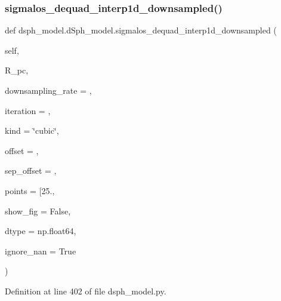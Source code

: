 \subsubsection{\texorpdfstring{sigmalos\+\_\+dequad\+\_\+interp1d\+\_\+downsampled()}{sigmalos\_dequad\_interp1d\_downsampled()}}
{\footnotesize\ttfamily def dsph\+\_\+model.\+d\+Sph\+\_\+model.\+sigmalos\+\_\+dequad\+\_\+interp1d\+\_\+downsampled (\begin{DoxyParamCaption}\item[{}]{self,  }\item[{}]{R\+\_\+pc,  }\item[{}]{downsampling\+\_\+rate = {},  }\item[{}]{iteration = {},  }\item[{}]{kind = {\ttfamily \char`\"{}cubic\char`\"{}},  }\item[{}]{offset = {},  }\item[{}]{sep\+\_\+offset = {},  }\item[{}]{points = {\ttfamily \mbox{[}25.},  }\item[{}]{show\+\_\+fig = {\ttfamily False},  }\item[{}]{dtype = {\ttfamily np.float64},  }\item[{}]{ignore\+\_\+nan = {\ttfamily True} }\end{DoxyParamCaption})}



Definition at line 402 of file dsph\+\_\+model.\+py.


